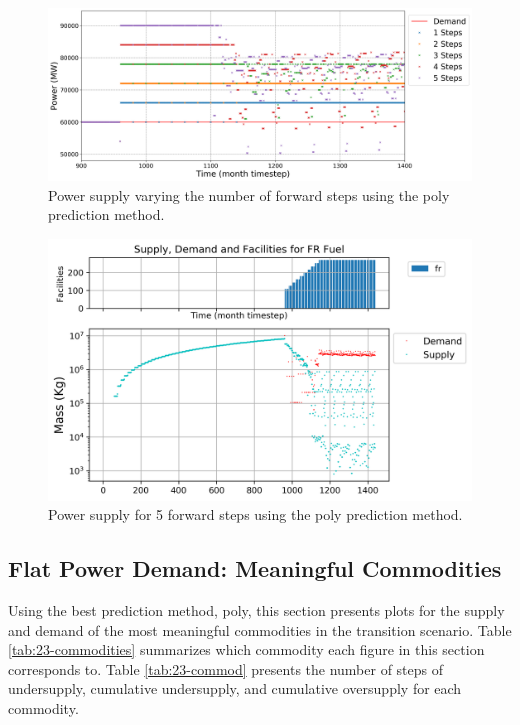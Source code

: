 \documentclass[11pt]{article}
\begin{document}
\begin{figure}[H]
	\centering
	\includegraphics[width=\textwidth]{23-figures/23-power-buffer0-poly-steps.png} 
	\hfill
	\caption{Power supply varying the number of forward steps using the poly prediction method.}
	\label{fig:23-ste-poly}
\end{figure}

\begin{figure}[H]
	\centering
	\includegraphics[width=\textwidth]{23-figures/0-S5-poly-mixerout.png} 
	\hfill
	\caption{Power supply for 5 forward steps using the poly prediction method.}
	\label{fig:23-ste-fft-mixerout}
\end{figure}

\subsection{Flat Power Demand: Meaningful Commodities}
Using the best prediction method, poly, this section presents plots 
for the supply and demand of the most meaningful commodities in the transition scenario.
Table \ref{tab:23-commodities} summarizes which commodity each figure in this section 
corresponds to.
Table \ref{tab:23-commod} presents the number of steps of undersupply, 
cumulative undersupply, and cumulative oversupply for each commodity.
\end{document}
